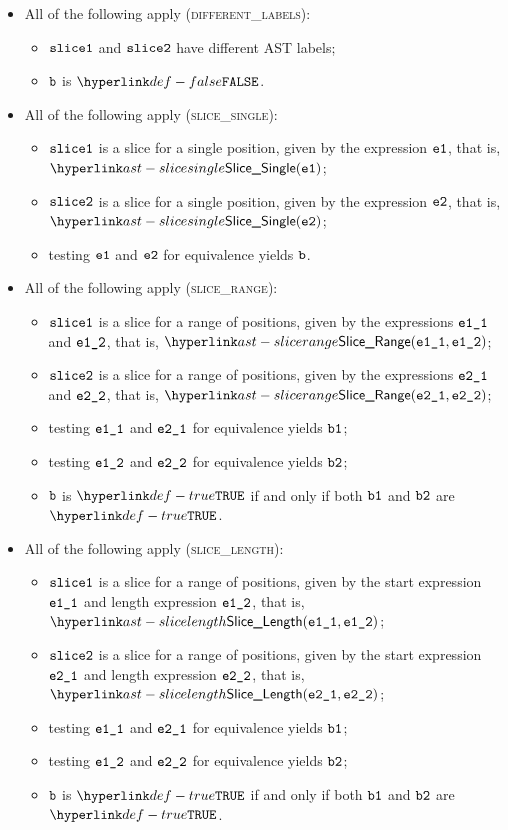 \begin{itemize}
  \item All of the following apply (\textsc{different\_labels}):
  \begin{itemize}
    \item $\texttt{slice1}$ and $\texttt{slice2}$ have different AST labels;
    \item $\texttt{b}$ is $\False$.
  \end{itemize}

  \item All of the following apply (\textsc{slice\_single}):
  \begin{itemize}
    \item $\texttt{slice1}$ is a slice for a single position, given by the expression $\texttt{e1}$, that is, $\SliceSingle(\veone)$;
    \item $\texttt{slice2}$ is a slice for a single position, given by the expression $\texttt{e2}$, that is, $\SliceSingle(\vetwo)$;
    \item testing $\texttt{e1}$ and $\texttt{e2}$ for equivalence yields $\texttt{b}$\ProseOrTypeError.
  \end{itemize}

  \item All of the following apply (\textsc{slice\_range}):
  \begin{itemize}
    \item $\texttt{slice1}$ is a slice for a range of positions, given by the expressions $\texttt{e1\_1}$ and $\texttt{e1\_2}$, that is, $\SliceRange(\veoneone, \veonetwo)$;
    \item $\texttt{slice2}$ is a slice for a range of positions, given by the expressions $\texttt{e2\_1}$ and $\texttt{e2\_2}$, that is, $\SliceRange(\vetwoone, \vetwotwo)$;
    \item testing $\texttt{e1\_1}$ and $\texttt{e2\_1}$ for equivalence yields $\texttt{b1}$\ProseOrTypeError;
    \item testing $\texttt{e1\_2}$ and $\texttt{e2\_2}$ for equivalence yields $\texttt{b2}$\ProseOrTypeError;
    \item $\texttt{b}$ is $\True$ if and only if both $\texttt{b1}$ and $\texttt{b2}$ are $\True$.
  \end{itemize}

  \item All of the following apply (\textsc{slice\_length}):
  \begin{itemize}
    \item $\texttt{slice1}$ is a slice for a range of positions, given by the start expression $\texttt{e1\_1}$ and length expression $\texttt{e1\_2}$, that is, $\SliceLength(\veoneone, \veonetwo)$;
    \item $\texttt{slice2}$ is a slice for a range of positions, given by the start expression $\texttt{e2\_1}$ and length expression $\texttt{e2\_2}$, that is, $\SliceLength(\vetwoone, \vetwotwo)$;
    \item testing $\texttt{e1\_1}$ and $\texttt{e2\_1}$ for equivalence yields $\texttt{b1}$\ProseOrTypeError;
    \item testing $\texttt{e1\_2}$ and $\texttt{e2\_2}$ for equivalence yields $\texttt{b2}$\ProseOrTypeError;
    \item $\texttt{b}$ is $\True$ if and only if both $\texttt{b1}$ and $\texttt{b2}$ are $\True$.
  \end{itemize}
\end{itemize}

